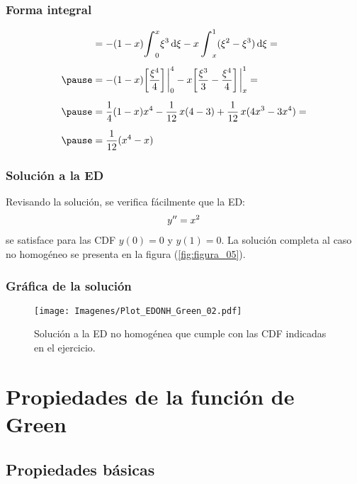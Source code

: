 \documentclass[12pt]{beamer}
\begin{document}
\begin{frame}
\frametitle{Forma integral}
\begin{eqnarray}
\begin{aligned}[b]
&= - (1 - x) \scaleint{6ex}_{0}^{x} \xi^{3} \dd{\xi} - x \, \scaleint{6ex}_{x}^{1} (\xi^{2} - \xi^{3}) \dd{\xi} = \\[0.5em] \pause
&= - (1 - x) \bigg[ \dfrac{\xi^{4}}{4} \bigg] \eval_{0}^{4} - x \bigg[ \dfrac{\xi^{3}}{3} - \dfrac{\xi^{4}}{4} \bigg] \eval_{x}^{1} = \\[0.5em] \pause
&= \dfrac{1}{4} (1 - x) x^{4} - \dfrac{1}{12} \, x (4 - 3) + \dfrac{1}{12} \, x (4 x^{3} - 3 x^{4}) = \\[0.5em] \pause
&= \dfrac{1}{12} (x^{4} - x)
\end{aligned}
\label{eq:ecuacion_07_36}
\end{eqnarray}
\end{frame}
\begin{frame}
\frametitle{Solución a la ED}
Revisando la solución, se verifica fácilmente que la ED:
\pause
\begin{align*}
{y}^{\prime \prime} = x^{2}
\end{align*}
se satisface para las CDF $y (0) = 0$ y $y (1) = 0$. \pause La solución completa al caso no homogéneo se presenta en la figura (\ref{fig:figura_05}).
\end{frame}
\begin{frame}
\frametitle{Gráfica de la solución}
\begin{figure}[H]
    \centering
    \texttt{[image: Imagenes/Plot\_EDONH\_Green\_02.pdf]}
    \caption{Solución a la ED no homogénea que cumple con las CDF indicadas en el ejercicio.}
    \label{fig:figura_06}
\end{figure}
\end{frame}

\section{Propiedades de la función de Green}
\subsection{Propiedades básicas}
\end{document}

